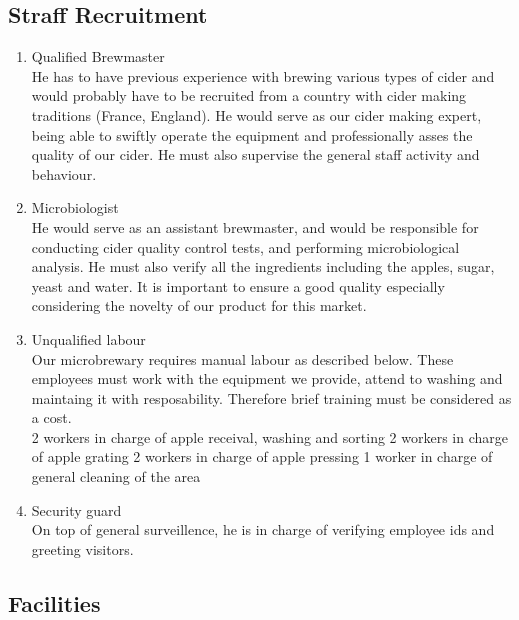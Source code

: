 \documentclass[11pt]{article}
\begin{document}
  \subsection{Straff Recruitment}
  \begin{enumerate}
  \item Qualified Brewmaster \\
He has to have previous experience with brewing various types of cider and would probably have to be recruited from a country with cider making traditions (France, England). He would serve as our cider making expert, being able to swiftly operate the equipment and professionally asses the quality of our cider. He must also supervise the general staff activity and behaviour.

  \item Microbiologist \\
He would serve as an assistant brewmaster, and would be responsible for conducting cider quality control tests, and performing microbiological analysis. He must also verify all the ingredients including the apples, sugar, yeast and water.
It is important to ensure a good quality especially considering the novelty of our product for this market.

  \item Unqualified labour \\
Our microbrewary requires manual labour as described below. These employees must work with the equipment we provide, attend to washing and maintaing it with resposability. Therefore brief training must be considered as a cost. \\
  2 workers in charge of apple receival, washing and sorting
  2 workers in charge of apple grating
  2 workers in charge of apple pressing
  1 worker in charge of general cleaning of the area

  \item Security guard \\
On top of general surveillence, he is in charge of verifying employee ids and greeting visitors.
  \end{enumerate}


  \subsection{Facilities}
\end{document}
